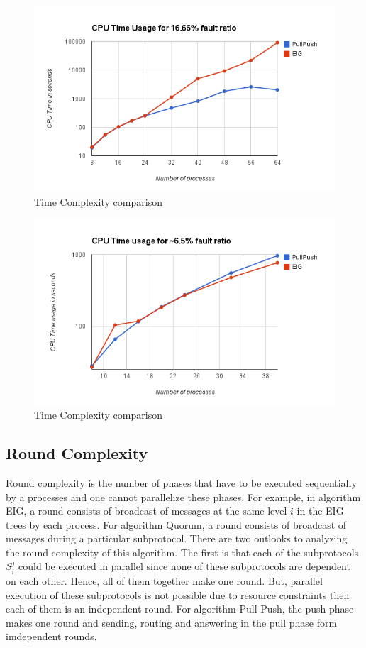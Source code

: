 \begin{figure}[h]
 \centering
\includegraphics[scale=0.4]{Time16}
\caption{Time Complexity comparison}
 \label{fig:time16}
\end{figure}

\begin{figure}[h]
 \centering
\includegraphics[scale=0.4]{Time6}
\caption{Time Complexity comparison}
 \label{fig:time6}
\end{figure}

\subsection{Round Complexity}
Round complexity is the number of phases that have to be executed sequentially by a processes and one cannot parallelize these phases. For example, in algorithm EIG, a round consists of broadcast of messages at the same level $i$ in the EIG trees by each process. For algorithm Quorum, a round consists of broadcast of messages during a particular subprotocol. There are two outlooks to analyzing the round complexity of this algorithm. The first is that each of the subprotocols $S_i^j$ could be executed in parallel since none of these subprotocols are dependent on each other. Hence, all of them together make one round. But, parallel execution of these subprotocols is not possible due to resource constraints then each of them is an independent round. For algorithm Pull-Push, the push phase makes one round and sending, routing and answering in the pull phase form imdependent rounds.

